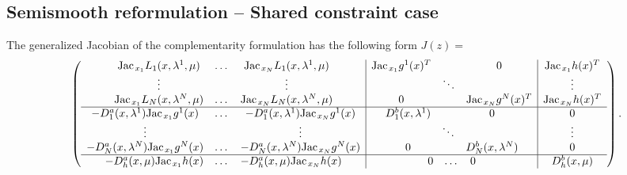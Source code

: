\documentclass[11pt, a4paper]{article}
\newcommand{\Jac}{\textrm{Jac\hskip+.1em}}
\begin{document}
\subsection{Semismooth reformulation -- Shared constraint case\label{app:nseq:jointcase}}

The generalized Jacobian of the complementarity formulation has the following form $J(z) =$
$$
\left(
\begin{array}{c|c|c}
	\begin{matrix}
	\Jac_{x_1} L_1(x, \lambda^1, \mu)  & \dots & \Jac_{x_N} L_1(x, \lambda^1, \mu)  \\
	\vdots & & \vdots \\
	\Jac_{x_1} L_N(x, \lambda^N, \mu)  & \dots & \Jac_{x_N} L_N(x, \lambda^N, \mu)  \\
	\end{matrix}
&
	\begin{matrix}
	\Jac_{x_1} g^1(x)^T & & 0 \\
	& \ddots & \\
	0 & & \Jac_{x_N} g^N(x)^T \\
	\end{matrix}	
&
	\begin{matrix}
	\Jac_{x_1} h(x)^T \\
	\vdots \\
	\Jac_{x_N} h(x)^T \\
	\end{matrix}	
\\
\hline 
	\begin{matrix}	
	- D_1^a(x, \lambda^1) \Jac_{x_1} g^1(x) & \dots & - D_1^a(x, \lambda^1) \Jac_{x_N} g^1(x) \\
	\vdots & & \vdots \\
	- D_N^a(x, \lambda^N) \Jac_{x_1} g^N(x) & \dots & - D_N^a(x, \lambda^N) \Jac_{x_N} g^N(x) \\
	\end{matrix}		
&
	\begin{matrix}	
	 D^b_{1}(x, \lambda^1) & & 0 \\
	 & \ddots &  \\
	0  &  &  D^b_{N}(x, \lambda^N) \\
	\end{matrix}			
&
	\begin{matrix}	
	 0 \\
	\vdots  \\
	0  \\
	\end{matrix}			
\\
\hline 
	\begin{matrix}	
	- D_h^a(x, \mu) \Jac_{x_1} h(x) & \dots & - D_h^a(x, \mu) \Jac_{x_N} h(x) \\
	\end{matrix}		
&
	\begin{matrix}	
	0  & \dots &  0 \\
	\end{matrix}			
&
	\begin{matrix}	
	D^b_{h}(x, \mu) \\
	\end{matrix}			
\end{array}	
\right) .
$$
\end{document}
